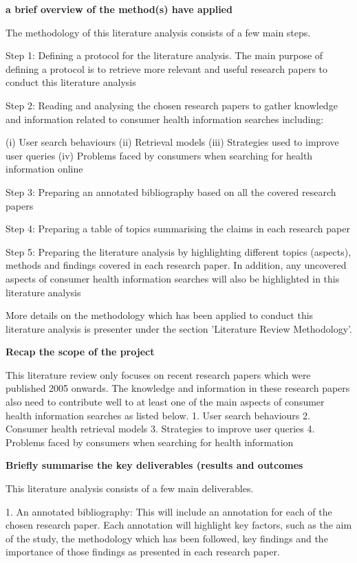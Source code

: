 \documentclass[]{article}
\begin{document}
	
\textbf{a brief overview of the method(s) have applied }
	
The methodology of this literature analysis consists of a few main steps.
	
Step 1: Defining a protocol for the literature analysis. The main purpose of defining a protocol is to retrieve more relevant and useful research papers to conduct this literature analysis 
	
Step 2: Reading and analysing the chosen research papers to gather knowledge and information related to consumer health information searches including:
	
	(i)	User search behaviours
	(ii) Retrieval models
	(iii) Strategies used to improve user queries
	(iv) Problems faced by consumers when searching for health information online
	
Step 3: Preparing an annotated bibliography based on all the covered research papers
	
Step 4: Preparing a table of topics summarising the claims in each research paper
	
Step 5: Preparing the literature analysis by highlighting different topics (aspects), methods and findings covered in each research paper. In addition, any uncovered aspects of consumer health information searches will also be highlighted in this literature analysis
	
More details on the methodology which has been applied to conduct this literature analysis is presenter under the section 'Literature Review Methodology'. 
	
\textbf{Recap the scope of the project}
	
This literature review only focuses on recent research papers which were published 2005 onwards. The knowledge and information in these research papers also need to contribute well to at least one of the main aspects of consumer health information searches as listed below.
	1.	User search behaviours
	2.	Consumer health retrieval models
	3.	Strategies to improve user queries 
	4.	Problems faced by consumers when searching for health information  
	
\textbf{Briefly summarise the key deliverables (results and outcomes}
	
This literature analysis consists of a few main deliverables.
	
1.	An annotated bibliography: This will include an annotation for each of the chosen research paper. Each annotation will highlight key factors, such as the aim of the study, the methodology which has been followed, key findings and the importance of those findings as presented in each research paper.  
	
\end{document}
